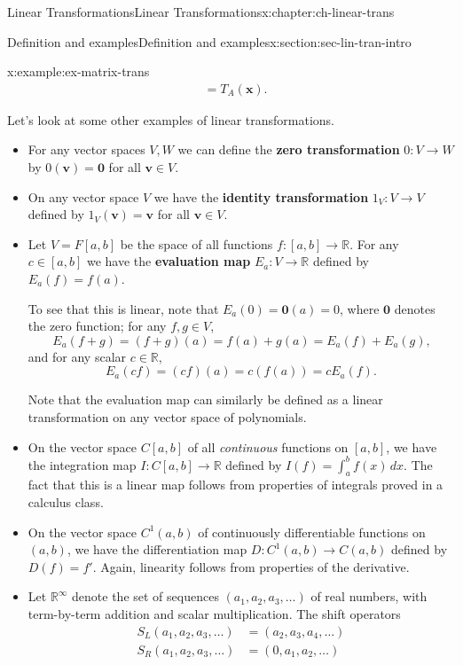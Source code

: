 \documentclass[oneside,10pt,]{book}
\newcommand{\terminology}[1]{\textbf{#1}}
\numberwithin{equation}{section}
\newcommand{\R}{\mathbb{R}}
\newcommand{\vv}{\mathbf{v}}
\newcommand{\xx}{\mathbf{x}}
\newcommand{\amp}{&}
\begin{document}
\begin{chapterptx}{Linear Transformations}{}{Linear Transformations}{}{}{x:chapter:ch-linear-trans}
\begin{sectionptx}{Definition and examples}{}{Definition and examples}{}{}{x:section:sec-lin-tran-intro}
\begin{example}{}{x:example:ex-matrix-trans}
\begin{align*}
\amp = T_A(\xx)\text{.}
\end{align*}
%
\end{example}
Let's look at some other examples of linear transformations.%
\begin{itemize}[label=\textbullet]
\item{}For any vector spaces \(V,W\) we can define the \terminology{zero transformation} \(0:V\to W\) by \(0(\vv)=\mathbf{0}\) for all \(\vv\in V\).%
\item{}On any vector space \(V\) we have the \terminology{identity transformation} \(1_V:V\to V\) defined by \(1_V(\vv)=\vv\) for all \(\vv\in V\).%
\item{}Let \(V = F[a,b]\) be the space of all functions \(f:[a,b]\to \R\). For any \(c\in [a,b]\) we have the \terminology{evaluation map} \(E_a: V\to \R\) defined by \(E_a(f) = f(a)\).%
\par
To see that this is linear, note that \(E_a(0)=\mathbf{0}(a)=0\), where \(\mathbf{0}\) denotes the zero function; for any \(f,g\in V\),%
\begin{equation*}
E_a(f+g)=(f+g)(a)=f(a)+g(a)=E_a(f)+E_a(g)\text{,}
\end{equation*}
and for any scalar \(c\in \R\),%
\begin{equation*}
E_a(cf) = (cf)(a) = c(f(a))=cE_a(f)\text{.}
\end{equation*}
%
\par
Note that the evaluation map can similarly be defined as a linear transformation on any vector space of polynomials.%
\item{}On the vector space \(C[a,b]\) of all \emph{continuous} functions on \([a,b]\), we have the integration map \(I:C[a,b]\to \R\) defined by \(I(f)=\int_a^b f(x)\,dx\). The fact that this is a linear map follows from properties of integrals proved in a calculus class.%
\item{}On the vector space \(C^1(a,b)\) of continuously differentiable functions on \((a,b)\), we have the differentiation map \(D: C^1(a,b)\to C(a,b)\) defined by \(D(f) = f'\). Again, linearity follows from properties of the derivative.%
\item{}Let \(\R^\infty\) denote the set of sequences \((a_1,a_2,a_3,\ldots)\) of real numbers, with term-by-term addition and scalar multiplication. The shift operators%
\begin{align*}
S_L(a_1,a_2,a_3,\ldots)  \amp = (a_2,a_3,a_4,\ldots) \\
S_R(a_1,a_2,a_3,\ldots) \amp = (0,a_1,a_2,\ldots)
\end{align*}

\end{itemize}
\end{sectionptx}
\end{chapterptx}
\end{document}
